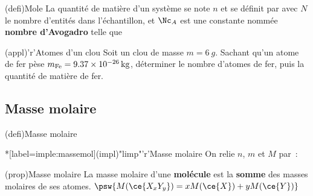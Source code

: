 \documentclass[../../main/main.tex]{subfiles}
\begin{document}
\begin{tcbraster}[raster columns=2, raster equal height=rows]
	\begin{tcb}[label=def:mole](defi){Mole}
		La quantité de matière d'un système se note $n$ et se définit par
		\psw{
			\[
				\boxed{n = \frac{N}{\Nc_A}}
				\quad \text{en \textbf{moles}, \si{mol}}
			\]
		}
		avec $N$ le nombre d'entités dans l'échantillon, et $\Nc_A$ est une
		constante nommée \textbf{nombre d'Avogadro} telle que
		\psw{
			\[
				\Nc_A = \SI{6.02214076e23}{mol^{-1}}
			\]
		}
	\end{tcb}
	\begin{tcb}[label=exem:nbat](appl)'r'{Atomes d'un clou}
		Soit un clou de masse $m = \SI{6}{g}$. Sachant qu'un atome de fer pèse
		$m_{\rm Fe} = \SI{9.37e-26}{kg}$, déterminer le nombre d'atomes de fer, puis
		la quantité de matière de fer.
		\tcblower
	\end{tcb}
\end{tcbraster}

\subsection{Masse molaire}

\begin{tcbraster}[raster columns=2, raster equal height=rows]
	\begin{tcb}[label=massemol](defi){Masse molaire}
	\end{tcb}
	\begin{tcb}*[label=imple:massemol](impl)"limp"'r'{Masse molaire}
		On relie $n$, $m$ et $M$ par~:
		\psw{
			\[\boxed{n = \frac{m}{M}}\]
		}
	\end{tcb}
\end{tcbraster}
(prop){Masse molaire}{
	La masse molaire d'une \textbf{molécule} est la \textbf{somme} des masses
	molaires de ses atomes.
}
{
	$\psw{M(\ce{X_xY_y}) = xM(\ce{X}) + yM(\ce{Y})}$
}
\end{document}
